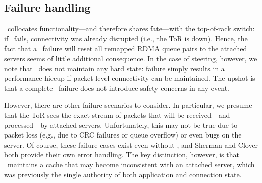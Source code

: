 \subsection{Failure handling}

\sword\ collocates functionality---and therefore shares fate---with the
top-of-rack switch: if \sword\ fails, connectivity was already
disrupted (i.e., the ToR is down).  Hence, the fact that a
\sword\ failure will reset all remapped RDMA queue pairs to the
attached servers seems of little additional consequence.  In the case
of steering, however, we note that \sword\ does not maintain any hard
state: failure simply results in a performance hiccup if packet-level
connectivity can be maintained.  The upshot is that a complete
\sword\ failure does not introduce safety concerns in any event.

However, there are other failure scenarios to consider.  In
particular, we presume that the ToR sees the exact stream of packets
that will be received---and processed---by attached servers.
Unfortunately, this may not be true due to packet loss (e.g., due to
CRC failures or queue overflow) or even bugs on the server.  Of
course, these failure cases exist even without \sword, and Sherman and
Clover both provide their own error handling.  The key distinction,
however, is that \sword\ maintains a cache that may become
inconsistent with an attached server, which was previously the single
authority of both application and connection state.




